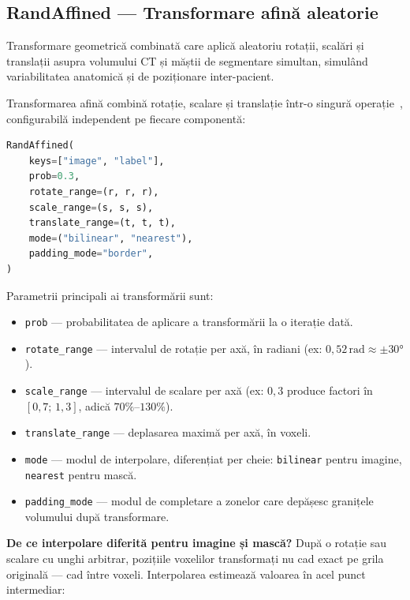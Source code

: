 \documentclass[12pt, a4paper]{report}
\begin{document}
\subsection{RandAffined — Transformare afină aleatorie}
\label{sec:randaffine}

\vspace{4pt}
\begin{infobox}
Transformare geometrică combinată care aplică aleatoriu rotații,
scalări și translații asupra volumului CT și măștii de segmentare
simultan, simulând variabilitatea anatomică și de poziționare
inter-pacient.
\end{infobox}

Transformarea afină combină rotație, scalare și translație
într-o singură operație~\cite{isensee2019automated}, configurabilă independent pe fiecare
componentă:

\begin{lstlisting}[language=Python]
RandAffined(
    keys=["image", "label"],
    prob=0.3,
    rotate_range=(r, r, r),
    scale_range=(s, s, s),
    translate_range=(t, t, t),
    mode=("bilinear", "nearest"),
    padding_mode="border",
)
\end{lstlisting}

Parametrii principali ai transformării sunt:
\begin{itemize}
    \item \texttt{prob} — probabilitatea de aplicare a transformării
          la o iterație dată.
    \item \texttt{rotate\_range} — intervalul de rotație per axă,
          în radiani (ex: $0{,}52\,\text{rad} \approx \pm30°$).
    \item \texttt{scale\_range} — intervalul de scalare per axă
          (ex: $0{,}3$ produce factori în $[0{,}7;\,1{,}3]$,
          adică $70\%$--$130\%$).
    \item \texttt{translate\_range} — deplasarea maximă per axă,
          în voxeli.
    \item \texttt{mode} — modul de interpolare, diferențiat per
          cheie: \texttt{bilinear} pentru imagine,
          \texttt{nearest} pentru mască.
    \item \texttt{padding\_mode} — modul de completare a zonelor
          care depășesc granițele volumului după transformare.
\end{itemize}
\textbf{De ce interpolare diferită pentru imagine și mască?}
După o rotație sau scalare cu unghi arbitrar, pozițiile voxelilor
transformați nu cad exact pe grila originală — cad între voxeli.
Interpolarea estimează valoarea în acel punct intermediar:
\end{document}
